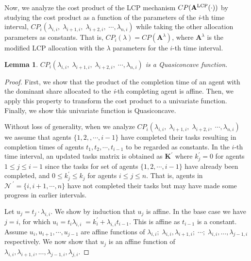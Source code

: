 \documentclass[letterpaper]{article} %
\newtheorem{lemma}{Lemma}
\theoremstyle{definition}
\begin{document}
\noindent Now, we analyze the cost product of the LCP mechanism $CP(\mathbf{A}^{\textnormal{LCP}}(\cdot))$ by studying the cost product as a function of the parameters of the \textit{i}-th time interval, $CP_i(\lambda_{i,i}, \; \lambda_{i+1,i}, \; \lambda_{i+2, i}, \; \cdots, \lambda_{n,i})$ while taking the other allocation parameters as constants.
That is, $CP_i(\lambda) = CP(\mathbf{A}^\lambda)$, where $\mathbf{A}^\lambda$ is the modified LCP allocation with the $\lambda$ parameters for the $i$-th time interval.

\begin{lemma} \label{cost-prod1}
$CP_i(\lambda_{i,i},\; \lambda_{i+1,i}, \; \lambda_{i+2, i}, \; \cdots, \lambda_{n,i})$ is a Quasiconcave function.
\end{lemma}

\begin{proof}
First, we show that the product of the completion time of an agent with the dominant share allocated to the \textit{i}-th completing agent is affine. Then, we apply this property to transform the cost product to a univariate function. Finally, we show this univariate function is Quasiconcave.

Without loss of generality, when we analyze $CP_i(\lambda_{i,i},\; \lambda_{i+1,i}, \; \lambda_{i+2, i}, \; \cdots, \lambda_{n,i})$ we assume that agents $\{1, 2, , \cdots, i -1\}$ have completed their tasks resulting in completion times of agents $t_{1}, t_{2}, \cdots, t_{i-1}$ to be regarded as constants. In the $i$-th time interval, an updated tasks matrix is obtained as $\mathbf{K}^{'}$ where $k^{'}_{j} = 0$ for agents $1 \leq j \leq i-1$ since the tasks for set of agents $\{1, 2, \cdots, i-1\}$ have already been completed, and $0 \leq k^{'}_{j} \leq k_{j}$ for agents $i \leq j\leq n $.
That is, agents in $\mathcal{N}^{\;'} = \{i, i+1, \cdots, n\}$ have not completed their tasks but may have made some progress in earlier intervals.

Let $u_{j} = t_{j} \cdot \lambda_{i,i}$. We show by induction that $u_{j}$ is affine. In the base case we have $j = i$, for which $u_{i} =  t_{i} \lambda_{i,i} \; = k^{'}_i + \lambda_{i,i}t_{i-1}$. This is affine as $t_{i-1}$ is a constant.
Assume $u_{i}, u_{i+1}, \cdots, u_{j-1}$ are affine functions of $\lambda_{i,i}; \; \lambda_{i,i}, \lambda_{i+1,i}; \; \cdots; \; \lambda_{i,i}, ...,  \lambda_{j-1,i}$ respectively. We now show that $u_{j}$ is an affine function of $\lambda_{i,i}, \lambda_{i+1,i}, ..., \lambda_{j-1,i}, \lambda_{j,i}$.


\end{proof}
\end{document}
